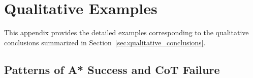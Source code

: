 \documentclass{article}
\begin{document}










\section{Qualitative Examples}
\label{app:qualitative_examples}

This appendix provides the detailed examples corresponding to the qualitative conclusions summarized in Section~\ref{sec:qualitative_conclusions}.

\subsection{Patterns of A* Success and CoT Failure}
\label{app:astar_success}
\end{document}
